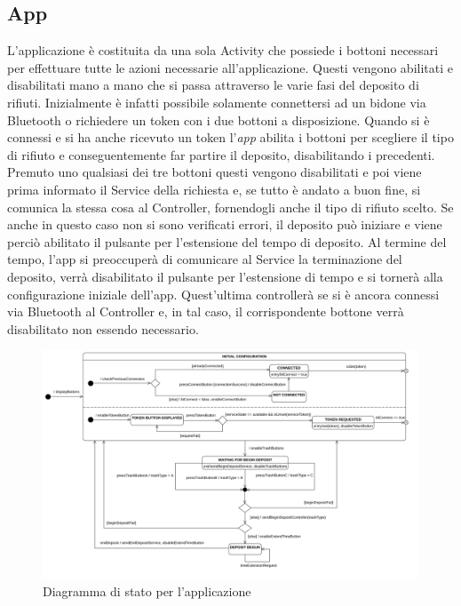 \documentclass[a4paper, 12pt]{report}
\begin{document}
			\subsection{App}
			L'applicazione è costituita da una sola Activity che possiede i bottoni necessari per
			effettuare tutte le azioni necessarie all'applicazione. Questi vengono abilitati e
			disabilitati mano a mano che si passa attraverso le varie fasi del deposito di rifiuti.
			Inizialmente è infatti possibile solamente connettersi ad un bidone via Bluetooth o
			richiedere un token con i due bottoni a disposizione. Quando si è connessi e si ha anche
			ricevuto un token l'\textit{app} abilita i bottoni per scegliere il tipo di rifiuto e
			conseguentemente far partire il deposito, disabilitando i precedenti. Premuto uno qualsiasi
			dei tre bottoni questi vengono disabilitati e poi viene prima informato il Service della
			richiesta e, se tutto è andato a buon fine, si comunica la stessa cosa al Controller,
			fornendogli anche il tipo di rifiuto scelto. Se anche in questo caso non si sono verificati
			errori, il deposito può iniziare e viene perciò abilitato il pulsante per l'estensione del
			tempo di deposito. Al termine del tempo, l'app si preoccuperà di comunicare al Service la
			terminazione del deposito, verrà disabilitato il pulsante per l'estensione di tempo e si
			tornerà alla configurazione iniziale dell'app. Quest'ultima controllerà se si è ancora
			connessi via Bluetooth al Controller e, in tal caso, il corrispondente bottone verrà
			disabilitato non essendo necessario.
			\begin{figure}[H]
				\centering
				\includegraphics[width=1.03\textwidth]{"img/AppStatechart.png"}    
				\caption{Diagramma di stato per l'applicazione}
			\end{figure}
\end{document}
